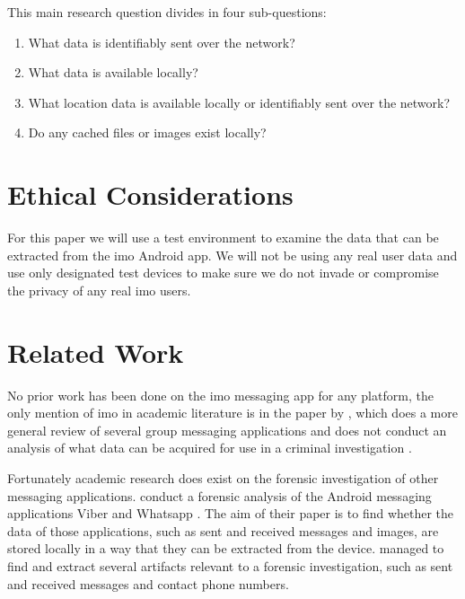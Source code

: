 \documentclass[conference]{IEEEtran}
\begin{document}
This main research question divides in four sub-questions:

\begin{enumerate}
    \item What data is identifiably sent over the network?
    \item What data is available locally?
    \item What location data is available locally or identifiably sent over the
        network?
    \item Do any cached files or images exist locally?
\end{enumerate}


\section{Ethical Considerations}\label{sec:ethics}

For this paper we will use a test environment to examine the data that can be
extracted from the imo Android app. We will not be using any real user data and
use only designated test devices to make sure we do not invade or compromise the
privacy of any real imo users.


\section{Related Work}\label{sec:relwork}

No prior work has been done on the imo messaging app for any platform, the only
mention of imo in academic literature is in the paper by \citeauthor{zhu}, which
does a more general review of several group messaging applications and does not
conduct an analysis of what data can be acquired for use in a criminal
investigation \cite{zhu}.

Fortunately academic research does exist on the forensic investigation of other
messaging applications. \citeauthor{mahajan2013forensic} conduct a forensic
analysis of the Android messaging applications Viber and Whatsapp
\cite{mahajan2013forensic}. The aim of their paper is to find whether the data
of those applications, such as sent and received messages and images, are stored
locally in a way that they can be extracted from the device.
\citeauthor{mahajan2013forensic} managed to find and extract several artifacts
relevant to a forensic investigation, such as sent and received messages and
contact phone numbers.
\end{document}

